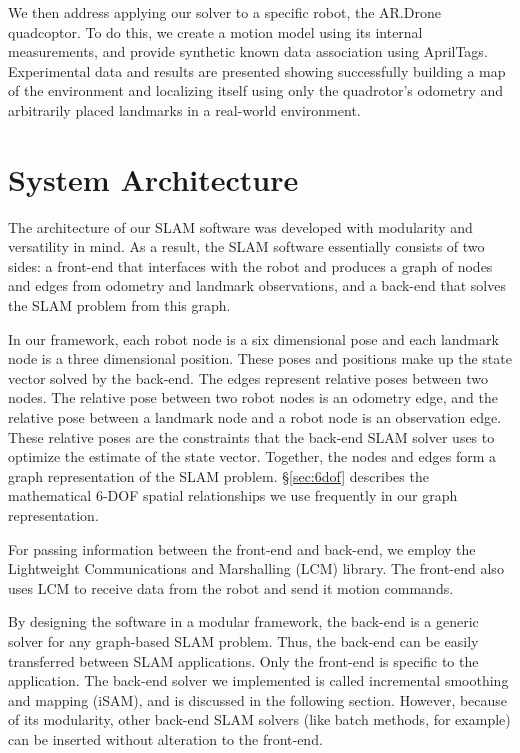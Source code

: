 \documentclass[conference]{IEEEtran}
\begin{document}
We then address applying our solver to a specific robot, the AR.Drone quadcoptor.  To do
this, we create a motion model using its internal measurements, and provide synthetic
known data association using AprilTags. \cite{olson2011tags} Experimental data and results are presented
showing successfully building a map of the environment and localizing itself using only
the quadrotor's odometry and arbitrarily placed landmarks in a real-world environment.

\section{System Architecture}
\label{sec:systemarchitecture}


The architecture of our SLAM software was developed with modularity and versatility in
mind.  As a result, the SLAM software essentially consists of two sides: a front-end that
interfaces with the robot and produces a graph of nodes and edges from odometry and
landmark observations, and a back-end that solves the SLAM problem from this graph.

In our framework, each robot node is a six dimensional pose and each landmark node is a
three dimensional position. These poses and positions make up the state vector solved by
the back-end.  The edges represent relative poses between two nodes. The relative pose
between two robot nodes is an odometry edge, and the relative pose between a landmark node
and a robot node is an observation edge. These relative poses are the constraints that the
back-end SLAM solver uses to optimize the estimate of the state vector. Together, the
nodes and edges form a graph representation of the SLAM problem.  \S\ref{sec:6dof}
describes the mathematical 6-DOF spatial relationships we use frequently in our graph
representation.


For passing information between the front-end and back-end, we employ the Lightweight
Communications and Marshalling (LCM) library. \cite{huang2010} The front-end also uses LCM
to receive data from the robot and send it motion commands.

By designing the software in a modular framework, the back-end is a generic solver for any
graph-based SLAM problem. Thus, the back-end can be easily transferred between SLAM
applications. Only the front-end is specific to the application. The back-end solver we
implemented is called incremental smoothing and mapping (iSAM), and is discussed in the
following section. However, because of its modularity, other back-end SLAM solvers (like
batch methods, for example) can be inserted without alteration to the front-end.
\end{document}
